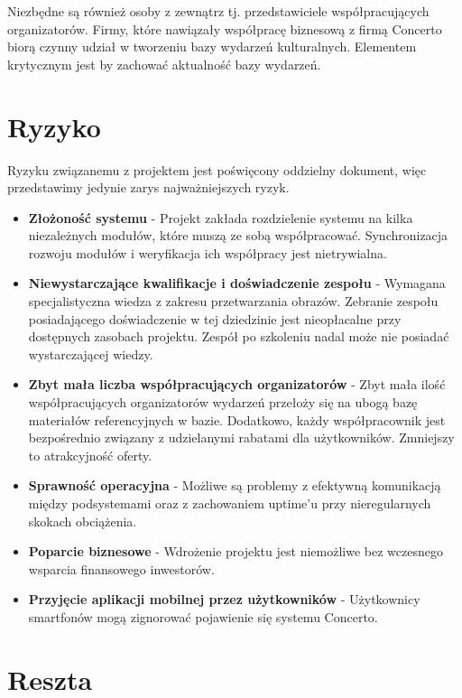 \documentclass[10pt]{dokument-ppi}
\begin{document}
Niezbędne są również osoby z zewnątrz tj. przedstawiciele współpracujących organizatorów. Firmy, które nawiązały współpracę biznesową z firmą Concerto biorą czynny udział w tworzeniu bazy wydarzeń kulturalnych. Elementem krytycznym jest by zachować aktualność bazy wydarzeń.

\section{Ryzyko}
Ryzyku związanemu z projektem jest poświęcony oddzielny dokument, więc przedstawimy jedynie zarys najważniejszych ryzyk.

\begin{itemize}
  \item \textbf{Złożoność systemu} - Projekt zakłada rozdzielenie systemu na kilka niezależnych modułów, które muszą ze sobą współpracować. Synchronizacja rozwoju modułów i weryfikacja ich współpracy jest nietrywialna. 

  \item \textbf{Niewystarczające kwalifikacje i doświadczenie zespołu} -  Wymagana specjalistyczna wiedza z zakresu przetwarzania obrazów. Zebranie zespołu posiadającego doświadczenie w tej dziedzinie jest nieopłacalne przy dostępnych zasobach projektu. Zespół po szkoleniu nadal może nie posiadać wystarczającej wiedzy. 

  \item \textbf{Zbyt mała liczba współpracujących organizatorów} - Zbyt mała ilość współpracujących organizatorów wydarzeń przełoży się na ubogą bazę materiałów referencyjnych w bazie. Dodatkowo, każdy współpracownik jest bezpośrednio związany z udzielanymi rabatami dla użytkowników. Zmniejszy to atrakcyjność oferty.

  \item \textbf{Sprawność operacyjna} - Możliwe są problemy z efektywną komunikacją między podsystemami oraz z zachowaniem uptime'u przy nieregularnych skokach obciążenia.

  \item \textbf{Poparcie biznesowe} - Wdrożenie projektu jest niemożliwe bez wczesnego wsparcia finansowego inwestorów.

  \item \textbf{Przyjęcie aplikacji mobilnej przez użytkowników} - Użytkownicy smartfonów mogą zignorować pojawienie się systemu Concerto.
\end{itemize}


\section{Reszta}
\end{document}
